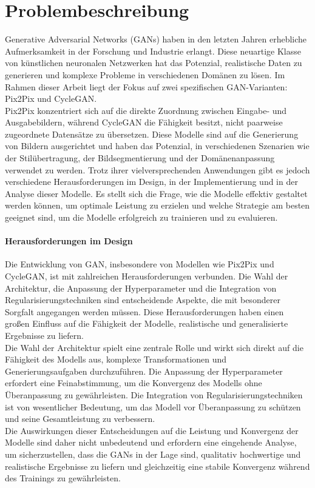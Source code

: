 \chapter{Problembeschreibung}
Generative Adversarial Networks (GANs) haben in den letzten Jahren erhebliche Aufmerksamkeit in der Forschung und Industrie erlangt. Diese neuartige Klasse von künstlichen neuronalen Netzwerken hat das Potenzial, realistische Daten zu generieren und komplexe Probleme in verschiedenen Domänen zu lösen. Im Rahmen dieser Arbeit liegt der Fokus auf zwei spezifischen GAN-Varianten: Pix2Pix und CycleGAN. 
\\
Pix2Pix konzentriert sich auf die direkte Zuordnung zwischen Eingabe- und Ausgabebildern, während CycleGAN die Fähigkeit besitzt, nicht paarweise zugeordnete Datensätze zu übersetzen. 
Diese Modelle sind auf die Generierung von Bildern ausgerichtet und haben das Potenzial, in verschiedenen Szenarien wie der Stilübertragung, der Bildsegmentierung und der Domänenanpassung verwendet zu werden. Trotz ihrer vielversprechenden Anwendungen gibt es jedoch verschiedene Herausforderungen im Design, in der Implementierung und in der Analyse dieser Modelle. Es stellt sich die Frage, wie die Modelle effektiv gestaltet werden können, um optimale Leistung zu erzielen und welche Strategie am besten geeignet sind, um die Modelle erfolgreich zu trainieren und zu evaluieren. 

\subsubsection{Herausforderungen im Design}
Die Entwicklung von GAN, insbesondere von Modellen wie Pix2Pix und CycleGAN, ist mit zahlreichen Herausforderungen verbunden. Die Wahl der Architektur, die Anpassung der Hyperparameter und die Integration von Regularisierungstechniken sind entscheidende Aspekte, die mit besonderer Sorgfalt angegangen werden müssen. Diese Herausforderungen haben einen großen Einfluss auf die Fähigkeit der Modelle, realistische und generalisierte Ergebnisse zu liefern.
\\
Die Wahl der Architektur spielt eine zentrale Rolle und wirkt sich direkt auf die Fähigkeit des Modells aus, komplexe Transformationen und Generierungsaufgaben durchzuführen. Die Anpassung der Hyperparameter erfordert eine Feinabstimmung, um die Konvergenz des Modells ohne Überanpassung zu gewährleisten. Die Integration von Regularisierungstechniken ist von wesentlicher Bedeutung, um das Modell vor Überanpassung zu schützen und seine Gesamtleistung zu verbessern.
\\
Die Auswirkungen dieser Entscheidungen auf die Leistung und Konvergenz der Modelle sind daher nicht unbedeutend und erfordern eine eingehende Analyse, um sicherzustellen, dass die GANs in der Lage sind, qualitativ hochwertige und realistische Ergebnisse zu liefern und gleichzeitig eine stabile Konvergenz während des Trainings zu gewährleisten.

